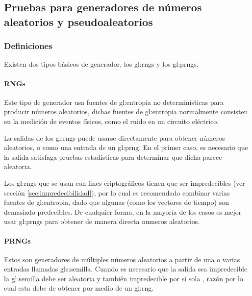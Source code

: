 %
%

\subsection{Pruebas para generadores de números aleatorios y pseudoaleatorios}
\label{sec:pruebas_para_generadores}


\subsubsection{Definiciones} %

Existen dos tipos básicos de generador, los \gls{gl:rng}s y los \gls{gl:prng}s.

\paragraph{RNGs} %

Este tipo de generador usa fuentes de \gls{gl:entropia} no determinísticas 
para producir números aleatorios, dichas fuentes de \gls{gl:entropia} 
normalmente consisten en la medición de eventos físicos, como el ruido 
en un circuito eléctrico.

La salidas de los \gls{gl:rng}s puede usarse directamente para obtener números 
aleatorios, o como una entrada de un \gls{gl:prng}. En el primer caso, es 
necesario que la salida satisfaga pruebas estadísticas para determinar que 
dicha parece aleatoria.

Los \gls{gl:rng}s que se usan con fines criptográficos tienen que ser 
impredecibles (ver sección \ref{sec:impredecibilidad}), por lo cual es 
recomendado combinar varias fuentes de \gls{gl:entropia}, dado que algunas 
(como los vectores de tiempo) son demasiado predecibles. De cualquier forma, 
en la mayoría de los casos es mejor usar \gls{gl:prng}s para obtener de manera 
directa numeros aleatorios.

\paragraph{PRNGs} %

Estos son generadores de múltiples números aleatorios a partir de una o varias 
entradas llamadas \gls{gls:semilla}. Cuando es necesario que la salida sea 
impredecible la \gls{gl:semilla} debe ser aleatoria y también impredecible 
por sí sola , razón por lo cual esta debe de obtener por medio de un 
\gls{gl:rng}.


